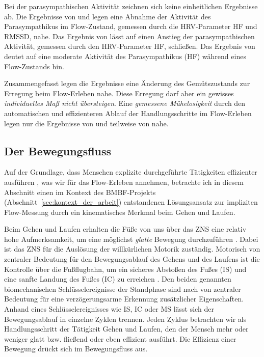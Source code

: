 Bei der parasympathischen Aktivität zeichnen sich keine einheitlichen Ergebnisse ab. Die Ergebnisse von \citet{deManzano2010} und \citet{Keller2011} legen eine Abnahme der Aktivität des Parasympathikus im Flow-Zustand, gemessen durch die \ac{HRV}-Parameter \ac{HF} und \acs{RMSSD}, nahe. Das Ergebnis von \citet{Peifer2014} lässt auf einen Anstieg der parasympathischen Aktivität, gemessen durch den \ac{HRV}-Parameter \ac{HF}, schließen. Das Ergebnis von \citet{Tozman2015} deutet auf eine moderate Aktivität des Parasympathikus (\ac{HF}) während eines Flow-Zustands hin.

Zusammengefasst legen die Ergebnisse eine Änderung des Gemütszustands zur Erregung beim Flow-Erleben nahe. Diese Erregung darf aber ein gewisses \emph{individuelles Maß nicht übersteigen}. Eine \emph{gemessene Mühelosigkeit} durch den automatischen und effizienteren Ablauf der Handlungsschritte im Flow-Erleben legen nur die Ergebnisse von \citet{Peifer2014} und teilweise von \citet{Tozman2015} nahe.

\subsection{Der Bewegungsfluss} 

\label{ssub:der_bewegungsfluss}

Auf der Grundlage, dass Menschen explizite durchgeführte Tätigkeiten effizienter ausführen \citep[][S.~753]{Dietrich2004}, was wir für das Flow-Erleben annehmen, betrachte ich in diesem Abschnitt einen im Kontext des \acs{BMBF}-Projekts (Abschnitt~\ref{sec:kontext_der_arbeit}) entstandenen Lösungsansatz zur impliziten Flow-Messung durch ein kinematisches Merkmal beim Gehen und Laufen.

Beim Gehen und Laufen erhalten die Füße von uns über das \ac{ZNS} eine relativ hohe Aufmerksamkeit, um eine möglichst \emph{glatte} Bewegung durchzuführen \citep[][S.~193]{Brooks1986}. Dabei ist das ZNS für die Auslösung der willkürlichen Motorik zuständig. Motorisch von zentraler Bedeutung für den Bewegungsablauf des Gehens und des Laufens ist die Kontrolle über die Fußflugbahn, um ein sicheres Abstoßen des Fußes (\ac{IS}) und eine sanfte Landung des Fußes (\ac{IC}) zu erreichen \citep[][S.~197]{Winter1989}. Den beiden genannten biomechanischen Schlüsselereignisse der Standphase sind nach \citet{Aminian2002, Lee2011} von zentraler Bedeutung für eine verzögerungsarme Erkennung zusätzlicher Eigenschaften. Anhand eines Schlüsselereignisses wie \ac{IS}, \ac{IC} oder \ac{MS} lässt sich der Bewegungsablauf in einzelne Zyklen trennen. Jeden Zyklus betrachten wir als Handlungsschritt der Tätigkeit Gehen und Laufen, den der Mensch mehr oder weniger glatt bzw. fließend oder eben effizient ausführt. Die Effizienz einer Bewegung drückt sich im Bewegungsfluss aus. 

